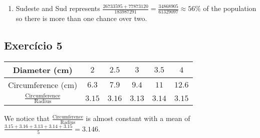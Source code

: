 \begin{enumerate}
\begin{center}
  \end{center}
\item
  Sudeste and Sud represents
  $\frac{26733595+77873120}{183987291} = \frac{34868905}{61329097}
  \approx 56\%$ of the population so there is more than one chance over two.
\end{enumerate}

\subsection*{Exercício 5}

\begin{center}
\begin{tabular}{| c | c  | c | c | c | c |}
\hline
Diameter (cm) & $2$ & $2.5$ & $3$ & $3.5$ & $4$ \\
\hline
Circumference (cm) & $6.3$ & $7.9$ & $9.4$ & $11$ & $12.6$ \\
\hline
$\frac{\text{Circumference}}{\text{Radius}}$ & $3.15$ & $3.16$ & $3.13$ &
$3.14$ & $3.15$ \\
\hline
\end{tabular}
\end{center}

We notice that $\frac{\text{Circumference}}{\text{Radius}}$ is almost constant
with a mean of $\frac{3.15+3.16+3.13+3.14+3.15}{5} = 3.146$.



